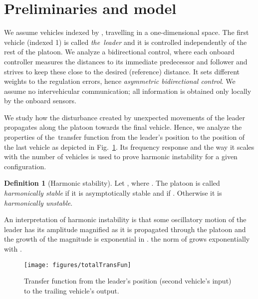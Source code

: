 \documentclass[technote, 10pt, twoside]{IEEEtran}
\theoremstyle{plain}
\theoremstyle{definition}
\newtheorem{definition}{Definition}
\theoremstyle{assump}
\begin{document}
\section{Preliminaries and model}
We assume  vehicles indexed by , travelling in
a one-dimensional space. The first vehicle (indexed 1) is called
\textit{the~leader} and it is controlled independently of the rest of the
platoon. We analyze a bidirectional control, where each onboard controller
measures the distances to its immediate predecessor and follower and strives
to keep these close to the desired (reference) distance. It sets different
weights to the  regulation errors, hence \textit{asymmetric bidirectional
control}. We assume no intervehicular communication; all information is obtained
only locally by the onboard sensors.

We study how the disturbance created by unexpected movements of the leader
propagates along the platoon towards the final vehicle. Hence, we analyze the
properties of the~transfer function
 from the leader's position to the position of
the last vehicle as depicted in Fig.~\ref{fig:totalTransferFunction}. Its
frequency response and the way it scales with the number of vehicles 
is used to prove harmonic instability for a given configuration.
\begin{definition}[Harmonic stability\cite{Tangerman2012}]
	Let , where . The platoon is called \textit{harmonically stable} if it is asymptotically stable and if . Otherwise it is \textit{harmonically unstable}.
\end{definition}
An interpretation of harmonic instability is that some oscillatory motion of the
leader has its amplitude magnified as it is propagated through the platoon and
the growth of the magnitude is exponential in  \cite{Tangerman2012}.
 the
 norm of  grows exponentially with
.
\begin{figure}
\centering
	\texttt{[image: figures/totalTransFun]}
	\caption{Transfer function from the leader's position (second vehicle's input)
	to the trailing vehicle's output.}
	\label{fig:totalTransferFunction}  
\end{figure}
\end{document}
